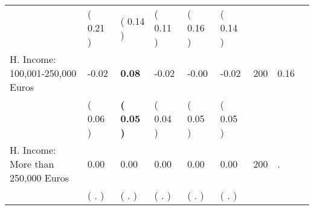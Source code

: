 \begin{tabular}{L{6.2cm} C{1.8cm} C{1.8cm} C{1.8cm} C{1.8cm} C{1.8cm} C{1.8cm} C{0.3cm} C{0.3cm}}
 & (     0.21 ) & (     0.14 ) & (     0.11 ) & (     0.16 ) & (     0.14 )  & \\
H. Income: 100,001-250,000 Euros &     -0.02 & \textbf{     0.08} &     -0.02 &     -0.00 &     -0.02  & 200 &       0.16 \\ 
 & (     0.06 ) & \textbf{(     0.05 )} & (     0.04 ) & (     0.05 ) & (     0.05 )  & \\
H. Income: More than 250,000 Euros &      0.00 &      0.00 &      0.00 &      0.00 &      0.00  & 200 &          . \\ 
 & (        . ) & (        . ) & (        . ) & (        . ) & (        . )  & \\
\bottomrule
\end{tabular}
